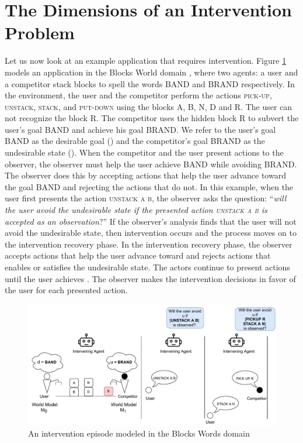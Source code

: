 \section{The Dimensions of an Intervention Problem}
Let us now look at an example application that requires intervention.
Figure \ref{fig:episode} models an application in the Blocks World domain \cite{gupta1992bw}, where two agents: a user and a competitor stack blocks to spell the words BAND and BRAND respectively.
In the environment, the user and the competitor perform the actions \textsc{pick-up}, \textsc{unstack}, \textsc{stack}, and \textsc{put-down} using the blocks A, B, N, D and R. 
The user can not recognize the block R.
The competitor uses the hidden block R to subvert the user's goal BAND and achieve his goal BRAND.
We refer to the user's goal BAND as the desirable goal (\desired) and the competitor's goal BRAND as the undesirable state (\undesired).
When the competitor and the user present actions to the observer, the observer must help the user achieve BAND while avoiding BRAND. 
The observer does this by accepting actions that help the user advance toward the goal BAND and rejecting the actions that do not. 
In this example, when the user first presents the action \textsc{unstack a b}, the observer asks the question: ``\textit{will the user avoid the undesirable state if the presented action \textsc{unstack a b} is accepted as an observation}?''
If the observer's analysis finds that the user will not avoid the undesirable state, then intervention occurs and the process moves on to the intervention recovery phase.
In the intervention recovery phase, the observer accepts actions that help the user advance toward \desired and rejects actions that enables or satisfies the undesirable state.
The actors continue to present actions until the user achieves \desired.
The observer makes the intervention decisions in favor of the user for each presented action.
\begin{figure}[ptb]
  \centering
\includegraphics[width=\columnwidth]{img/episode.pdf}
\caption{An intervention episode modeled in the Blocks Words domain}
\label{fig:episode}
\end{figure}

